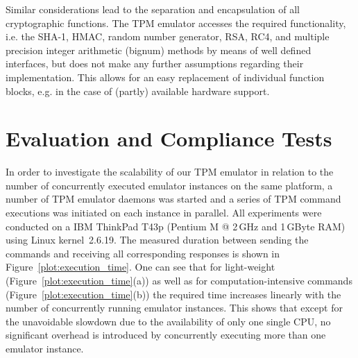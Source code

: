 \documentclass[runningheads]{llncs}
\begin{document}
Similar considerations lead to the separation and encapsulation of all
cryptographic functions. The TPM emulator accesses the required functionality,
i.e. the SHA-1, HMAC, random number generator, RSA, RC4, and multiple
precision integer arithmetic (bignum) methods by means of well defined
interfaces, but does not make any further assumptions regarding their
implementation. This allows for an easy replacement of individual function
blocks, e.g. in the case of (partly) available hardware support.


\section{Evaluation and Compliance Tests}\label{sec:state}
In order to investigate the scalability of our TPM emulator in relation to
the number of concurrently executed emulator instances on the same platform,
a number of TPM emulator daemons was started and a series of TPM command
executions was initiated on each instance in parallel. All experiments were
conducted on a IBM ThinkPad T43p (Pentium M @ 2\,GHz and 1\,GByte RAM) using
Linux kernel~2.6.19. The measured duration between sending the commands and
receiving all corresponding responses is shown in
Figure~\ref{plot:execution_time}. One can see that for light-weight
(Figure~\ref{plot:execution_time}(a)) as well as for computation-intensive
commands (Figure~\ref{plot:execution_time}(b)) the required time increases
linearly with the number of concurrently running emulator instances. This
shows that except for the unavoidable slowdown due to the availability of
only one single CPU, no significant overhead is introduced by concurrently
executing more than one emulator instance.
\end{document}
